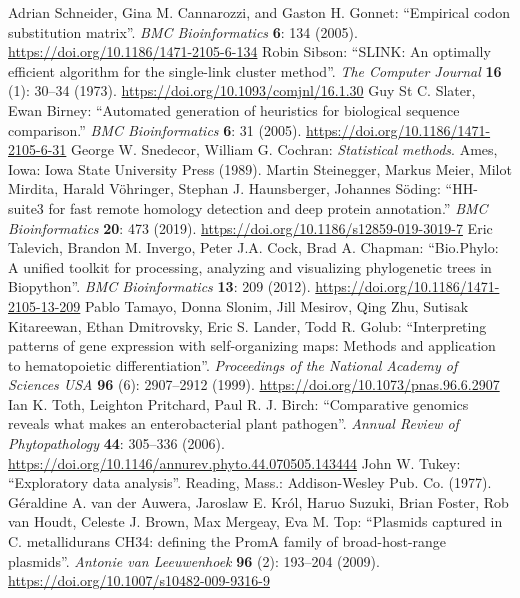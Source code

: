 \documentclass{report}
\begin{document}
\begin{thebibliography}{99}
Adrian Schneider, Gina M. Cannarozzi, and Gaston H. Gonnet: ``Empirical codon substitution matrix''. \textit{BMC Bioinformatics} {\bf 6}: 134 (2005).
\url{https://doi.org/10.1186/1471-2105-6-134}
Robin Sibson: ``SLINK: An optimally efficient algorithm for the single-link cluster method''. \textit{The Computer Journal} {\bf 16} (1): 30--34 (1973).
\url{https://doi.org/10.1093/comjnl/16.1.30}
Guy St C. Slater, Ewan Birney: ``Automated generation of heuristics for biological sequence comparison.'' \textit{BMC Bioinformatics} {\bf 6}: 31 (2005).
\url{https://doi.org/10.1186/1471-2105-6-31}
George W. Snedecor, William G. Cochran: \textit{Statistical methods}. Ames, Iowa: Iowa State University Press (1989).
Martin Steinegger, Markus Meier, Milot Mirdita, Harald V\"ohringer, Stephan J. Haunsberger, Johannes S\"oding: ``HH-suite3 for fast remote homology detection and deep protein annotation.'' \textit{BMC Bioinformatics} {\bf 20}: 473 (2019).
\url{https://doi.org/10.1186/s12859-019-3019-7}
Eric Talevich, Brandon M. Invergo, Peter J.A. Cock, Brad A. Chapman: ``Bio.Phylo: A unified toolkit for processing, analyzing and visualizing phylogenetic trees in Biopython''. \textit{BMC Bioinformatics} {\bf 13}: 209 (2012).
\url{https://doi.org/10.1186/1471-2105-13-209}
Pablo Tamayo, Donna Slonim, Jill Mesirov, Qing Zhu, Sutisak Kitareewan, Ethan Dmitrovsky, Eric S. Lander, Todd R. Golub: ``Interpreting patterns of gene expression with self-organizing maps: Methods and application to hematopoietic differentiation''. \textit{Proceedings of the National Academy of Sciences USA} {\bf 96} (6): 2907--2912 (1999).
\url{https://doi.org/10.1073/pnas.96.6.2907}
Ian K. Toth, Leighton Pritchard, Paul R. J. Birch: ``Comparative genomics reveals what makes an enterobacterial plant pathogen''. {\it Annual Review of Phytopathology} {\bf 44}: 305--336 (2006).
\url{https://doi.org/10.1146/annurev.phyto.44.070505.143444}
John W. Tukey: ``Exploratory data analysis''. Reading, Mass.: Addison-Wesley Pub. Co. (1977).
G\'eraldine A. van der Auwera, Jaroslaw E. Kr\'ol, Haruo Suzuki, Brian Foster, Rob van Houdt, Celeste J. Brown, Max Mergeay, Eva M. Top: ``Plasmids captured in C. metallidurans CH34: defining the PromA family of broad-host-range plasmids''.
\textit{Antonie van Leeuwenhoek} {\bf 96} (2): 193--204 (2009).
\url{https://doi.org/10.1007/s10482-009-9316-9}

\end{thebibliography}
\end{document}
